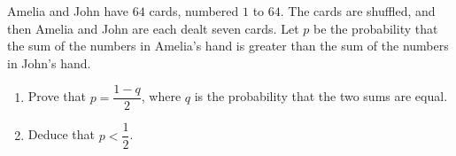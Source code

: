 Amelia and John have $64$ cards, numbered $1$ to $64$. The cards are shuffled, and then Amelia and John are each dealt seven cards. Let $p$ be the probability that the sum of the numbers in Amelia's hand is greater than the sum of the numbers in John's hand.
\begin{enumerate}
\item[(a)] Prove that $p=\dfrac{1-q}{2}$, where $q$ is the probability that the two sums are equal.
\item[(b)] Deduce that $p<\dfrac{1}{2}$.
\end{enumerate}

